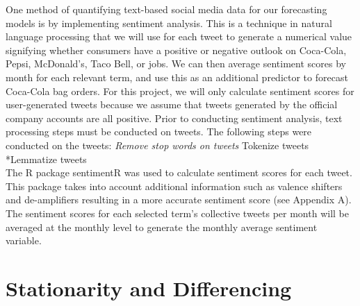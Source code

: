 \documentclass[12pt,oneside]{chicagocapstone}
\begin{document}
One method of quantifying text-based social media data for our forecasting models is by implementing sentiment analysis. This is a technique in natural language processing that we will use for each tweet to generate a numerical value signifying whether consumers have a positive or negative outlook on Coca-Cola, Pepsi, McDonald's, Taco Bell, or jobs. We can then average sentiment scores by month for each relevant term, and use this as an additional predictor to forecast Coca-Cola bag orders. For this project, we will only calculate sentiment scores for user-generated tweets because we assume that tweets generated by the official company accounts are all positive.
Prior to conducting sentiment analysis, text processing steps must be conducted on tweets. The following steps were conducted on the tweets:
\emph{Remove stop words on tweets
}Tokenize tweets
*Lemmatize tweets\\
The R package sentimentR was used to calculate sentiment scores for each tweet. This package takes into account additional information such as valence shifters and de-amplifiers resulting in a more accurate sentiment score (see Appendix A). The sentiment scores for each selected term's collective tweets per month will be averaged at the monthly level to generate the monthly average sentiment variable.

\hypertarget{stationarity-and-differencing}{%
\section*{Stationarity and Differencing}\label{stationarity-and-differencing}}
\end{document}
